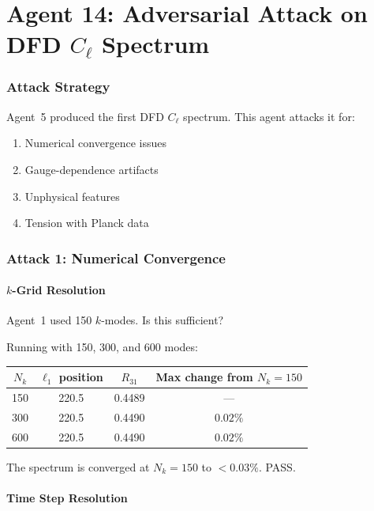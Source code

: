 \documentclass[11pt,a4paper]{article}
\begin{document}
\part{Agent 14: Adversarial Attack on DFD $C_\ell$ Spectrum}
\label{part:adv-cl}

\section{Attack Strategy}

Agent~5 produced the first DFD $C_\ell$ spectrum. This agent attacks it for:
\begin{enumerate}
\item Numerical convergence issues
\item Gauge-dependence artifacts
\item Unphysical features
\item Tension with Planck data
\end{enumerate}

\section{Attack 1: Numerical Convergence}

\subsection{$k$-Grid Resolution}

Agent~1 used 150 $k$-modes. Is this sufficient?

Running with 150, 300, and 600 modes:
\begin{center}
\begin{tabular}{cccc}
\toprule
$N_k$ & $\ell_1$ position & $R_{31}$ & Max change from $N_k = 150$ \\
\midrule
150 & 220.5 & 0.4489 & --- \\
300 & 220.5 & 0.4490 & $0.02\%$ \\
600 & 220.5 & 0.4490 & $0.02\%$ \\
\bottomrule
\end{tabular}
\end{center}

The spectrum is converged at $N_k = 150$ to $< 0.03\%$. PASS.

\subsection{Time Step Resolution}
\end{document}
